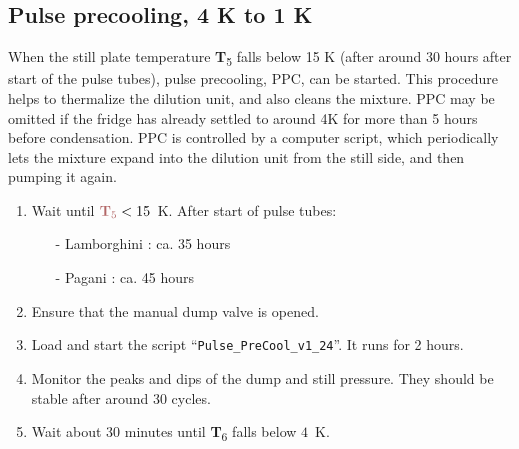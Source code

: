 \documentclass{article}[18pt,A4]
\newcommand{\temperature}[1]{{\color{temperaturecolor}\textbf{T}\textsubscript{#1}}}
\begin{document}
\subsection{Pulse precooling, 4 K to 1 K}
When the still plate temperature \temperature{5} falls below 15 K (after around 30 hours after start of the pulse tubes),
pulse precooling, PPC, can be started.
This procedure helps to thermalize the dilution unit, and also cleans the mixture.
PPC may be omitted if the fridge has already settled to around 4K for more than 5 hours before condensation.
PPC is controlled by a computer script,
which periodically lets the mixture expand into the dilution unit from the still side, and then pumping it again.
\begin{enumerate}
    \item Wait until $\temperature{5} < 15$~K. After start of pulse tubes:
    \begin{enumerate}
        \item[-] Lamborghini : ca. 35 hours
        \item[-] Pagani : ca. 45 hours
    \end{enumerate}
    \item Ensure that the manual dump valve is opened.
    \item Load and start the script ``\texttt{Pulse\_PreCool\_v1\_24}''. It runs for 2 hours.
    \item Monitor the peaks and dips of the dump and still pressure. They should be stable after around 30 cycles.
    \item Wait about 30 minutes until \temperature{6} falls below $4$~K.
\end{enumerate}

\newpage
\end{document}

